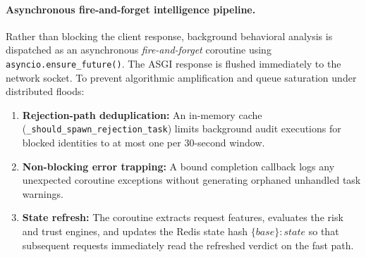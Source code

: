 \documentclass[journal,10pt]{IEEEtran}
\begin{document}
\paragraph{Asynchronous fire-and-forget intelligence pipeline.}
Rather than blocking the client response, background behavioral analysis is dispatched as an asynchronous \emph{fire-and-forget} coroutine using \texttt{asyncio.ensure\_future()}. The ASGI response is flushed immediately to the network socket. To prevent algorithmic amplification and queue saturation under distributed floods:
\begin{enumerate}
    \item \textbf{Rejection-path deduplication:} An in-memory cache (\texttt{\_should\_spawn\_rejection\_task}) limits background audit executions for blocked identities to at most one per 30-second window.
    \item \textbf{Non-blocking error trapping:} A bound completion callback logs any unexpected coroutine exceptions without generating orphaned unhandled task warnings.
    \item \textbf{State refresh:} The coroutine extracts request features, evaluates the risk and trust engines, and updates the Redis state hash $\{base\}{:}state$ so that subsequent requests immediately read the refreshed verdict on the fast path.
\end{enumerate}
\end{document}
